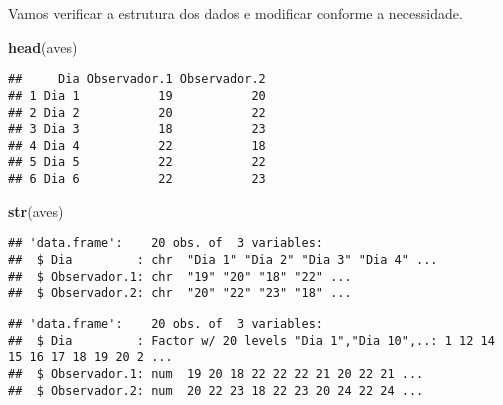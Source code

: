 \documentclass[14pt,titlepage, oneside, openany, a4paper]{book}
\newenvironment{Shaded}{\begin{snugshade}}{\end{snugshade}}
\newcommand{\FloatTok}[1]{\textcolor[rgb]{0.00,0.00,0.81}{#1}}
\newcommand{\KeywordTok}[1]{\textcolor[rgb]{0.13,0.29,0.53}{\textbf{#1}}}
\newcommand{\NormalTok}[1]{#1}
\newcommand{\OperatorTok}[1]{\textcolor[rgb]{0.81,0.36,0.00}{\textbf{#1}}}
\newcommand{\StringTok}[1]{\textcolor[rgb]{0.31,0.60,0.02}{#1}}
\begin{document}
Vamos verificar a estrutura dos dados e modificar conforme a necessidade.

\begin{Shaded}
\begin{Highlighting}[]
\KeywordTok{head}\NormalTok{(aves)}
\end{Highlighting}
\end{Shaded}

\begin{verbatim}
##     Dia Observador.1 Observador.2
## 1 Dia 1           19           20
## 2 Dia 2           20           22
## 3 Dia 3           18           23
## 4 Dia 4           22           18
## 5 Dia 5           22           22
## 6 Dia 6           22           23
\end{verbatim}

\begin{Shaded}
\begin{Highlighting}[]
\KeywordTok{str}\NormalTok{(aves)}
\end{Highlighting}
\end{Shaded}

\begin{verbatim}
## 'data.frame':    20 obs. of  3 variables:
##  $ Dia         : chr  "Dia 1" "Dia 2" "Dia 3" "Dia 4" ...
##  $ Observador.1: chr  "19" "20" "18" "22" ...
##  $ Observador.2: chr  "20" "22" "23" "18" ...
\end{verbatim}

\begin{Shaded}
\end{Shaded}

\begin{verbatim}
## 'data.frame':    20 obs. of  3 variables:
##  $ Dia         : Factor w/ 20 levels "Dia 1","Dia 10",..: 1 12 14 15 16 17 18 19 20 2 ...
##  $ Observador.1: num  19 20 18 22 22 22 21 20 22 21 ...
##  $ Observador.2: num  20 22 23 18 22 23 20 24 22 24 ...
\end{verbatim}
\end{document}
